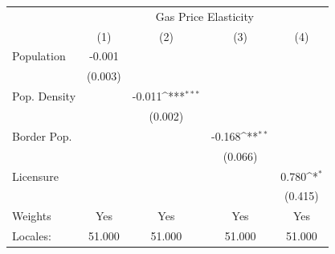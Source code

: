 {
\def\sym#1{\ifmmode^{#1}\else\(^{#1}\)\fi}
\begin{tabular}{l*{4}{c}}
\hline\hline
            &\multicolumn{4}{c}{Gas Price Elasticity}                                               \\
            &\multicolumn{1}{c}{(1)}         &\multicolumn{1}{c}{(2)}         &\multicolumn{1}{c}{(3)}         &\multicolumn{1}{c}{(4)}         \\
\hline
Population  &      -0.001         &                     &                     &                     \\
            &     (0.003)         &                     &                     &                     \\
[1em]
Pop. Density&                     &      -0.011\sym{***}&                     &                     \\
            &                     &     (0.002)         &                     &                     \\
[1em]
Border Pop. &                     &                     &      -0.168\sym{**} &                     \\
            &                     &                     &     (0.066)         &                     \\
[1em]
Licensure   &                     &                     &                     &       0.780\sym{*}  \\
            &                     &                     &                     &     (0.415)         \\
\hline
Weights     &         Yes         &         Yes         &         Yes         &         Yes         \\
Locales:    &      51.000         &      51.000         &      51.000         &      51.000         \\
\hline\hline
\end{tabular}
}
